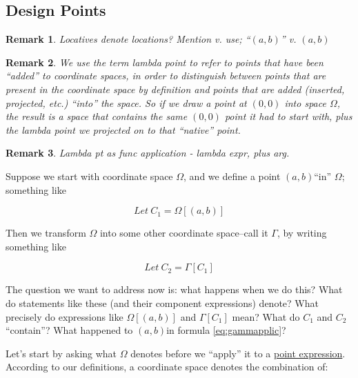 \documentclass[reqno,12pt]{tufte-handout}
\numberwithin{equation}{subsection}
\numberwithin{equation}{subsection}
\newtheorem{remark}{Remark}
\newcommand\cspace{coordinate space}
\newcommand\Omg{\(\Omega\)}
\newcommand\origin{\((0,0)\)}
\newcommand\ab{\((a,b)\)}
\begin{document}
  \subsection{Design Points}
  \label{sect:dpts}

  \begin{remark}
    Locatives denote locations?  Mention v. use; ``\((a,b)\)'' v. \((a,b)\)
  \end{remark}

  \begin{remark}
    We use the term \textit{lambda point} to refer to points that have
    been ``added'' to \cspace{}s, in order to distinguish between points
    that are present in the \cspace{} by definition and points that are
    added (inserted, projected, etc.) ``into'' the space.  So if we draw
    a point at \origin{} into space \Omg{}, the result is a space that
    contains the same \origin{} point it had to start with, plus the
    lambda point we projected on to that ``native'' point.
  \end{remark}

  \begin{remark}
    Lambda pt as func application - lambda expr, plus arg.
  \end{remark}

  Suppose we start with \cspace{} \Omg{}, and we define a point \ab ``in''
  \Omg{}; something like

  \begin{equation}
    \label{eq:omgapplic}
    Let\ C_1 = \Omega[(a,b)]
  \end{equation}

  Then we transform \Omg{} into some other \cspace{}--call it \(\Gamma\),
  by writing something like

  \begin{equation}
    \label{eq:gammapplic}
    Let\ C_2 = \Gamma[C_1]
  \end{equation}

  The question we want to address now is: what happens when we do this?
  What do statements like these (and their component expressions)
  denote?  What precisely do expressions like \(\Omega[(a,b)]\) and
  \(\Gamma[C_1]\) mean? What do \(C_1\) and \(C_2\) ``contain''?  What
  happened to \ab in formula \ref{eq:gammapplic}?

  Let's start by asking what \Omg{} denotes before we ``apply'' it to a
  \hyperref[subs:pointexprs]{point expression}.  According to our definitions, a \cspace{} denotes
  the combination of:
\end{document}
